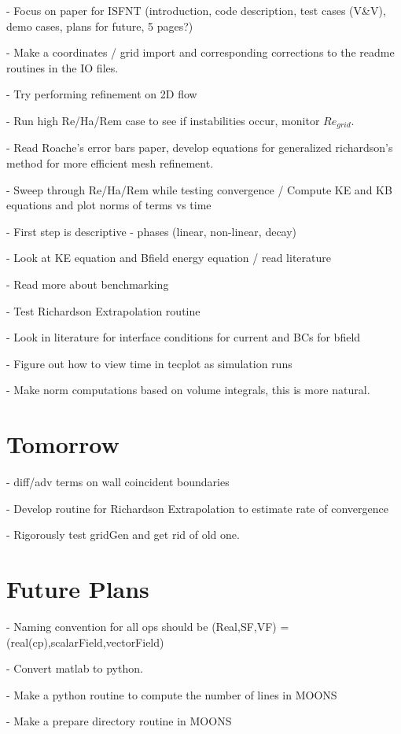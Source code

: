 \documentclass[11pt]{article}
\begin{document}
- Focus on paper for ISFNT (introduction, code description, test cases (V\&V), demo cases, plans for future, 5 pages?)

- Make a coordinates / grid import and corresponding corrections to the readme routines in the IO files.

- Try performing refinement on 2D flow

- Run high Re/Ha/Rem case to see if instabilities occur, monitor $Re_{grid}$.

- Read Roache's error bars paper, develop equations for generalized richardson's method for more efficient mesh refinement.


- Sweep through Re/Ha/Rem while testing convergence / Compute KE and KB equations and plot norms of terms vs time

- First step is descriptive - phases (linear, non-linear, decay)

- Look at KE equation and Bfield energy equation / read literature

- Read more about benchmarking

- Test Richardson Extrapolation routine

- Look in literature for interface conditions for current and BCs for bfield

- Figure out how to view time in tecplot as simulation runs

- Make norm computations based on volume integrals, this is more natural.

\section{Tomorrow}
- diff/adv terms on wall coincident boundaries

- Develop routine for Richardson Extrapolation to estimate rate of convergence

- Rigorously test gridGen and get rid of old one.


\section{Future Plans}

- Naming convention for all ops should be (Real,SF,VF) = (real(cp),scalarField,vectorField)

- Convert matlab to python.

- Make a python routine to compute the number of lines in MOONS

- Make a prepare directory routine in MOONS
\end{document}
